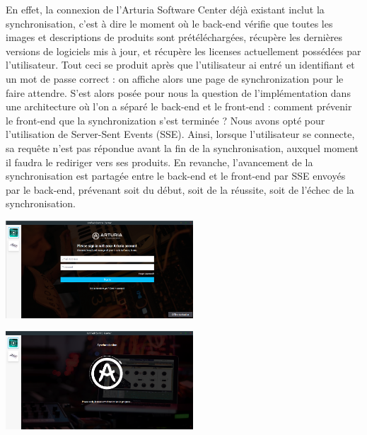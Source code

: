 \documentclass[francais]{rapportPFE}  %
\begin{document}
En effet, la connexion de l'Arturia Software Center déjà existant inclut la synchronisation, c'est à dire le moment où le back-end vérifie que toutes les images et descriptions de produits sont prétéléchargées, récupère les dernières versions de logiciels mis à jour, et récupère les licenses actuellement possédées par l'utilisateur. Tout ceci se produit après que l'utilisateur ai entré un identifiant et un mot de passe correct : on affiche alors une page de synchronization pour le faire attendre. S'est alors posée pour nous la question de l'implémentation dans une architecture où l'on a séparé le back-end et le front-end : comment prévenir le front-end que la synchronization s'est terminée ? Nous avons opté pour l'utilisation de Server-Sent Events (SSE). Ainsi, lorsque l'utilisateur se connecte, sa requête n'est pas répondue avant la fin de la synchronisation, auxquel moment il faudra le rediriger vers ses produits. En revanche, l'avancement de la synchronisation est partagée entre le back-end et le front-end par SSE envoyés par le back-end, prévenant soit du début, soit de la réussite, soit de l'échec de la synchronisation.
\begin{center}
    \centering
    \begin{minipage}{.5\textwidth}
    \centering
    \includegraphics[width=7cm]{graphics/disconnected.png}
    \label{fig:test1}
    \end{minipage}%
    \begin{minipage}{.5\textwidth}
    \centering
    \includegraphics[width=7cm]{graphics/sync.png}
    \label{fig:test2}
    \end{minipage}
    \end{center}
\end{document}
